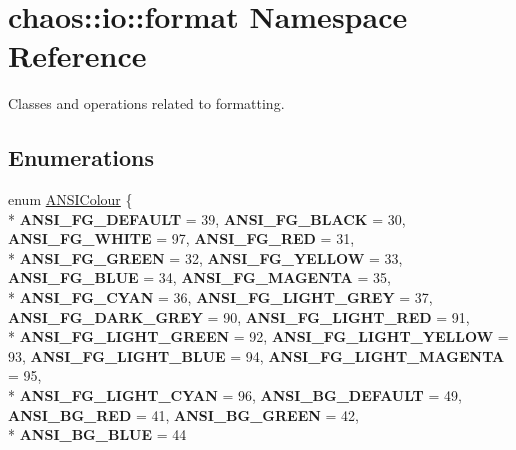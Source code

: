 \hypertarget{namespacechaos_1_1io_1_1format}{}\section{chaos\+:\+:io\+:\+:format Namespace Reference}
\label{namespacechaos_1_1io_1_1format}


Classes and operations related to formatting.  


\subsection*{Enumerations}
\begin{DoxyCompactItemize}
\item 
enum \hyperlink{namespacechaos_1_1io_1_1format_aa30dcff2478ffc94e33504c8886a5b1a}{A\+N\+S\+I\+Colour} \{ \\*
{\bfseries A\+N\+S\+I\+\_\+\+F\+G\+\_\+\+D\+E\+F\+A\+U\+L\+T} = 39, 
{\bfseries A\+N\+S\+I\+\_\+\+F\+G\+\_\+\+B\+L\+A\+C\+K} = 30, 
{\bfseries A\+N\+S\+I\+\_\+\+F\+G\+\_\+\+W\+H\+I\+T\+E} = 97, 
{\bfseries A\+N\+S\+I\+\_\+\+F\+G\+\_\+\+R\+E\+D} = 31, 
\\*
{\bfseries A\+N\+S\+I\+\_\+\+F\+G\+\_\+\+G\+R\+E\+E\+N} = 32, 
{\bfseries A\+N\+S\+I\+\_\+\+F\+G\+\_\+\+Y\+E\+L\+L\+O\+W} = 33, 
{\bfseries A\+N\+S\+I\+\_\+\+F\+G\+\_\+\+B\+L\+U\+E} = 34, 
{\bfseries A\+N\+S\+I\+\_\+\+F\+G\+\_\+\+M\+A\+G\+E\+N\+T\+A} = 35, 
\\*
{\bfseries A\+N\+S\+I\+\_\+\+F\+G\+\_\+\+C\+Y\+A\+N} = 36, 
{\bfseries A\+N\+S\+I\+\_\+\+F\+G\+\_\+\+L\+I\+G\+H\+T\+\_\+\+G\+R\+E\+Y} = 37, 
{\bfseries A\+N\+S\+I\+\_\+\+F\+G\+\_\+\+D\+A\+R\+K\+\_\+\+G\+R\+E\+Y} = 90, 
{\bfseries A\+N\+S\+I\+\_\+\+F\+G\+\_\+\+L\+I\+G\+H\+T\+\_\+\+R\+E\+D} = 91, 
\\*
{\bfseries A\+N\+S\+I\+\_\+\+F\+G\+\_\+\+L\+I\+G\+H\+T\+\_\+\+G\+R\+E\+E\+N} = 92, 
{\bfseries A\+N\+S\+I\+\_\+\+F\+G\+\_\+\+L\+I\+G\+H\+T\+\_\+\+Y\+E\+L\+L\+O\+W} = 93, 
{\bfseries A\+N\+S\+I\+\_\+\+F\+G\+\_\+\+L\+I\+G\+H\+T\+\_\+\+B\+L\+U\+E} = 94, 
{\bfseries A\+N\+S\+I\+\_\+\+F\+G\+\_\+\+L\+I\+G\+H\+T\+\_\+\+M\+A\+G\+E\+N\+T\+A} = 95, 
\\*
{\bfseries A\+N\+S\+I\+\_\+\+F\+G\+\_\+\+L\+I\+G\+H\+T\+\_\+\+C\+Y\+A\+N} = 96, 
{\bfseries A\+N\+S\+I\+\_\+\+B\+G\+\_\+\+D\+E\+F\+A\+U\+L\+T} = 49, 
{\bfseries A\+N\+S\+I\+\_\+\+B\+G\+\_\+\+R\+E\+D} = 41, 
{\bfseries A\+N\+S\+I\+\_\+\+B\+G\+\_\+\+G\+R\+E\+E\+N} = 42, 
\\*
{\bfseries A\+N\+S\+I\+\_\+\+B\+G\+\_\+\+B\+L\+U\+E} = 44

\end{DoxyCompactItemize}
